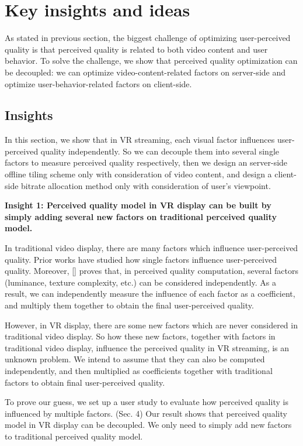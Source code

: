 \section{Key insights and ideas}

As stated in previous section, the biggest challenge of optimizing user-perceived quality is that perceived quality is related to both video content and user behavior. To solve the challenge, we show that perceived quality optimization can be decoupled: we can optimize video-content-related factors on server-side and optimize user-behavior-related factors on client-side.

\subsection{Insights}
In this section, we show that in VR streaming, each visual factor influences user-perceived quality independently. So we can decouple them into several single factors to measure perceived quality respectively, then we design an server-side offline tiling scheme only with consideration of video content, and design a client-side bitrate allocation method only with consideration of user's viewpoint.

\textbf{Insight 1: Perceived quality model in VR display can be built by simply adding several new factors on traditional perceived quality model.}

In traditional video display, there are many factors which influence user-perceived quality. Prior works have studied how single factors influence user-perceived quality. Moreover, [] proves that, in perceived quality computation, several factors (luminance, texture complexity, etc.) can be considered independently. As a result, we can independently measure the influence of each factor as a coefficient, and multiply them together to obtain the final user-perceived quality.

However, in VR display, there are some new factors which are never considered in traditional video display. So how these new factors, together with factors in traditional video display, influence the perceived quality in VR streaming, is an unknown problem. We intend to assume that they can also be computed independently, and then multiplied as coefficients together with traditional factors to obtain final user-perceived quality.

To prove our guess, we set up a user study to evaluate how perceived quality is influenced by multiple factors. (Sec. 4) Our result shows that perceived quality model in VR display can be decoupled. We only need to simply add new factors to traditional perceived quality model.


